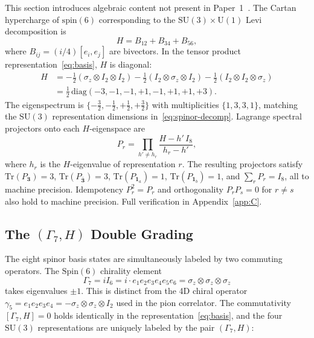 \documentclass[12pt]{article}
\theoremstyle{definition}
\theoremstyle{remark}
\newcommand{\spin}{\mathrm{Spin}}       %
\newcommand{\su}{\mathrm{SU}}           %
\newcommand{\tr}{\mathrm{Tr}}           %
\newcommand{\half}{\tfrac{1}{2}}
\newcommand{\GaSeven}{\Gamma_7}                      %
\newcommand{\Isix}{I_6}                              %
\begin{document}
	This section introduces algebraic content not present in
	Paper~1~\cite{FirestoneP1}.  The Cartan hypercharge of $\mathrm{spin}(6)$
	corresponding to the $\su(3)\times\mathrm{U}(1)$ Levi decomposition is
	\begin{equation}
		H = B_{12} + B_{34} + B_{56},
		\label{eq:cartan-H}
	\end{equation}
	where $B_{ij}=(i/4)[e_i,e_j]$ are bivectors.  In the tensor product
	representation~\eqref{eq:basis}, $H$ is diagonal:
	\begin{align}
		H &= -\half(\sigma_z\otimes I_2\otimes I_2)
		- \half(I_2\otimes\sigma_z\otimes I_2)
		- \half(I_2\otimes I_2\otimes\sigma_z)
		\label{eq:H-tensor} \\
		&= \half\,\mathrm{diag}(-3,-1,-1,+1,-1,+1,+1,+3).
		\label{eq:H-diag}
	\end{align}
	The eigenspectrum is $\{-\tfrac{3}{2},-\tfrac{1}{2},+\tfrac{1}{2},+\tfrac{3}{2}\}$
	with multiplicities $\{1,3,3,1\}$, matching the $\su(3)$ representation
	dimensions in~\eqref{eq:spinor-decomp}.  Lagrange spectral projectors onto
	each $H$-eigenspace are
	\begin{equation}
		P_r = \prod_{h' \neq h_r} \frac{H - h'\,I_8}{h_r - h'},
		\label{eq:lagrange-projector}
	\end{equation}
	where $h_r$ is the $H$-eigenvalue of representation $r$.  The resulting
	projectors satisfy $\tr(P_{\mathbf{3}})=3$, $\tr(P_{\bar{\mathbf{3}}})=3$,
	$\tr(P_{\mathbf{1}_a})=1$, $\tr(P_{\mathbf{1}_b})=1$, and
	$\sum_r P_r = I_8$, all to machine precision.  Idempotency
	$P_r^2 = P_r$ and orthogonality $P_r P_s = 0$ for $r\neq s$ also hold to
	machine precision.  Full verification in Appendix~\ref{app:C}.
	
	\subsection{The \texorpdfstring{$(\GaSeven, H)$}{(Γ₇, H)} Double Grading}
	\label{sec:double-grading}
	
	The eight spinor basis states are simultaneously labeled by two commuting
	operators.  The $\spin(6)$ chirality element
	\begin{equation}
		\GaSeven = i\Isix = i\cdot e_1 e_2 e_3 e_4 e_5 e_6
		= \sigma_z\otimes\sigma_z\otimes\sigma_z
		\label{eq:Gamma7}
	\end{equation}
	takes eigenvalues $\pm1$.  This is distinct from the 4D chiral operator
	$\gamma_5 = e_1 e_2 e_3 e_4 = -\sigma_z\otimes\sigma_z\otimes I_2$ used in
	the pion correlator.  The commutativity $[\GaSeven, H]=0$ holds identically
	in the representation~\eqref{eq:basis}, and the four $\su(3)$ representations
	are uniquely labeled by the pair $(\GaSeven, H)$:
	
\end{document}
